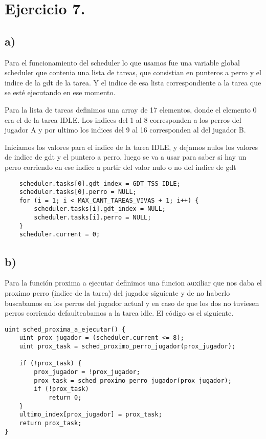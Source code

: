 \section{Ejercicio 7.}
\subsection{a)}
	Para el funcionamiento del scheduler lo que usamos fue una variable global scheduler que contenia una lista de tareas, que consistian en punteros a perro y el indice de la gdt de la tarea. Y el indice de esa lista correspondiente a la tarea que se esté ejecutando en ese momento.
	
	Para la lista de tareas definimos una array de 17 elementos, donde el elemento 0 era el de la tarea IDLE. Los indices del 1 al 8 corresponden a los perros del jugador A y por ultimo los indices del 9 al 16 corresponden al del jugador B.

	Iniciamos los valores para el indice de la tarea IDLE, y dejamos nulos los valores de indice de gdt y el puntero a perro, luego se va a usar para saber si hay un perro corriendo en ese indice a partir del valor nulo o no del indice de gdt
\begin{codesnippet}
\begin{verbatim}
    scheduler.tasks[0].gdt_index = GDT_TSS_IDLE;
    scheduler.tasks[0].perro = NULL;
    for (i = 1; i < MAX_CANT_TAREAS_VIVAS + 1; i++) {
        scheduler.tasks[i].gdt_index = NULL;
        scheduler.tasks[i].perro = NULL;
    }
    scheduler.current = 0;
\end{verbatim}
\end{codesnippet}

\subsection{b)}

Para la función proxima a ejecutar definimos una funcion auxiliar que nos daba el proximo perro (indice de la tarea) del jugador siguiente y de no haberlo buscabamos en los perros del jugador actual y en caso de que los dos no tuviesen perros corriendo defaulteabamos a la tarea idle. El código es el siguiente.

\begin{codesnippet}
\begin{verbatim}
uint sched_proxima_a_ejecutar() {
    uint prox_jugador = (scheduler.current <= 8);
    uint prox_task = sched_proximo_perro_jugador(prox_jugador);

    if (!prox_task) {
        prox_jugador = !prox_jugador;
        prox_task = sched_proximo_perro_jugador(prox_jugador);
        if (!prox_task)
            return 0;
    }
    ultimo_index[prox_jugador] = prox_task;
    return prox_task;
}
\end{verbatim}
\end{codesnippet}

